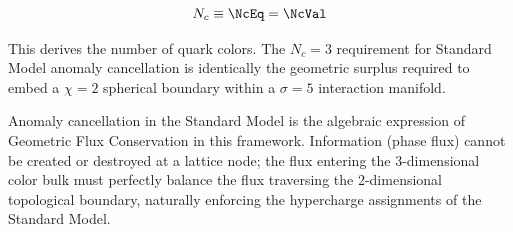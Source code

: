 \begin{equation}
    N_c \equiv \NcEq = \mathbf{\NcVal}
\end{equation}

This derives the number of quark colors. The $N_c=3$ requirement for Standard Model anomaly cancellation is identically the geometric surplus required to embed a $\chi=2$ spherical boundary within a $\sigma=5$ interaction manifold. 

Anomaly cancellation in the Standard Model is the algebraic expression of Geometric Flux Conservation in this framework. Information (phase flux) cannot be created or destroyed at a lattice node; the flux entering the 3-dimensional color bulk must perfectly balance the flux traversing the 2-dimensional topological boundary, naturally enforcing the hypercharge assignments of the Standard Model.